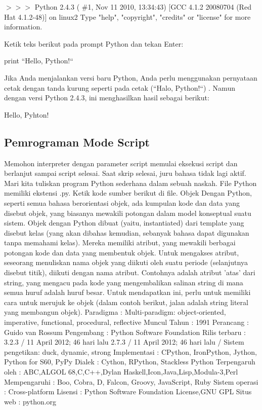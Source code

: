 $>$$>$$>$ Python 2.4.3 ( $  \#  $1, Nov 11 2010, 13:34:43) [GCC 4.1.2 20080704 (Red Hat 4.1.2-48)] on linux2 Type "help", "copyright", "credits" or "license" for more information.

Ketik teks berikut pada prompt Python dan tekan Enter:

print ``Hello, Python!``


Jika Anda menjalankan versi baru Python, Anda perlu menggunakan pernyataan cetak dengan tanda kurung seperti pada cetak (``Halo, Python!``) . Namun dengan versi Python 2.4.3, ini menghasilkan hasil sebagai berikut: 

Hello, Pyhton!
\subsection{Pemrograman Mode Script}
Memohon interpreter dengan parameter script memulai eksekusi script dan berlanjut sampai script selesai. Saat skrip selesai, juru bahasa tidak lagi aktif. Mari kita tuliskan program Python sederhana dalam sebuah naskah. File Python memiliki ekstensi .py. Ketik kode sumber berikut di file.
Objek Dengan Python, seperti semua bahasa berorientasi objek, ada kumpulan kode dan data yang disebut objek, yang biasanya mewakili potongan dalam model konseptual suatu sistem. Objek dengan Python dibuat (yaitu, instantiated) dari template yang disebut kelas (yang akan dibahas kemudian, sebanyak bahasa dapat digunakan tanpa memahami kelas). Mereka memiliki atribut, yang mewakili berbagai potongan kode dan data yang membentuk objek. Untuk mengakses atribut, seseorang menuliskan nama objek yang diikuti oleh suatu periode (selanjutnya disebut titik), diikuti dengan nama atribut. 
Contohnya adalah atribut 'atas' dari string, yang mengacu pada kode yang mengembalikan salinan string di mana semua huruf adalah huruf besar. Untuk mendapatkan ini, perlu untuk memiliki cara untuk merujuk ke objek (dalam contoh berikut, jalan adalah string literal yang membangun objek). 
Paradigma : Multi-paradigm: object-oriented, imperative, functional, procedural, reflective
Muncul Tahun : 1991
Perancang : Guido van Rossum
Pengembang : Python Software Foundation
Rilis terbaru : 3.2.3 / 11 April 2012; 46 hari lalu 2.7.3 / 11 April 2012; 46 hari lalu /
Sistem pengetikan: duck, dynamic, strong
Implementasi : CPython, IronPython, Jython, Python for S60, PyPy
Dialek : Cython, RPython, Stackless Python
Terpengaruh oleh : ABC,ALGOL 68,C,C++,Dylan Haskell,Icon,Java,Lisp,Modula-3,Perl
Mempengaruhi : Boo, Cobra, D, Falcon, Groovy, JavaScript, Ruby
Sistem operasi : Cross-platform
Lisensi : Python Software Foundation License,GNU GPL
Situs web : python.org